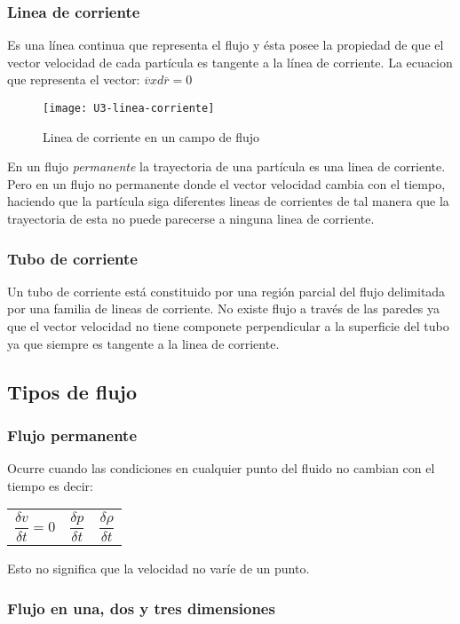\subsubsection{Linea de corriente}
Es una línea continua que representa el flujo y ésta posee la propiedad de que el vector velocidad de cada partícula es tangente a la línea de corriente. La ecuacion que representa el vector: $ \overline{v} x d\overline{r} = 0$

\begin{figure}[h]
	\centering
	\texttt{[image: U3-linea-corriente]}
	\caption{Linea de corriente en un campo de flujo}
\end{figure}

En un flujo \emph{permanente} la trayectoria de una partícula es una linea de corriente. Pero en un flujo no permanente donde el vector velocidad cambia con el tiempo, haciendo que la partícula siga diferentes lineas de corrientes de tal manera que la trayectoria de esta no puede parecerse a ninguna linea de corriente.

\subsubsection{Tubo de corriente}
Un tubo de corriente está constituido por una región parcial del flujo delimitada por una familia de lineas de corriente. No existe flujo a través de las paredes ya que el vector velocidad no tiene componete perpendicular a la superficie del tubo ya que siempre es tangente a la linea de corriente.

\subsection{Tipos de flujo}
\subsubsection{Flujo permanente}
Ocurre cuando las condiciones en cualquier punto del fluido no cambian con el tiempo es decir:

\begin{tabular}{r c l}
	$\dfrac{\delta v}{\delta t} = 0$ & $\dfrac{\delta p}{\delta t}$ & $ \dfrac{\delta \rho}{\delta t}$
\end{tabular}

Esto no significa que la velocidad no varíe de un punto.

\subsubsection{Flujo en una, dos y tres dimensiones}

